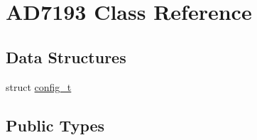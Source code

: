 \hypertarget{classAD7193}{}\section{A\+D7193 Class Reference}
\label{classAD7193}
\subsection*{Data Structures}
\begin{DoxyCompactItemize}
\item 
struct \hyperlink{structAD7193_1_1config__t}{config\+\_\+t}
\end{DoxyCompactItemize}
\subsection*{Public Types}
